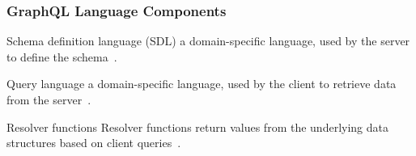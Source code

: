 \begin{frame}\frametitle{GraphQL Language Components}

\begin{block}{Schema definition language (SDL)}
a domain-specific language, used by the server to define the schema~\cite{migrating-to-gql}.
\end{block}

\begin{block}{Query language}
a domain-specific language, used by the client to retrieve data from the server~\cite{initial-analysis-of-gql}. 
\end{block}

\begin{block}{Resolver functions}
Resolver functions return values from the underlying data structures based on client queries~\cite{migrating-to-gql}.
\end{block}

\end{frame}
